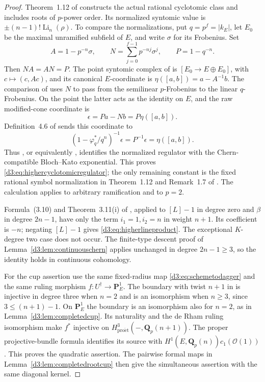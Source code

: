 \documentclass[11pt,a4paper]{amsart}
\numberwithin{equation}{section}
\theoremstyle{definition}
\theoremstyle{remark}
\newcommand{\Q}{\mathbf Q}
\newcommand{\PP}{\mathbf P}
\newcommand{\OO}{\mathcal O}
\begin{document}
\begin{proof}
Theorem~1.12 of \cite{BesserDeJeu} constructs the actual rational
cyclotomic class and includes roots of $p$-power order.
Its normalized syntomic value is
$\pm(n-1)!\operatorname{Li}_n(\rho)$.
To compare the normalizations, put $q=p^f=|k_E|$, let $E_0$ be the
maximal unramified subfield of $E$, and write $\sigma$ for its Frobenius.
Set
\[
 A=1-p^{-n}\sigma,\qquad
 N=\sum_{j=0}^{f-1}p^{-nj}\sigma^j,\qquad P=1-q^{-n}.
\]
Then $NA=AN=P$.  The point syntomic complex of
\cite[Example~2.2.4]{HuberKings} is
$[E_0\longrightarrow E\oplus E_0]$, with
$c\mapsto(c,Ac)$, and its canonical $E$-coordinate is
$\eta([a,b])=a-A^{-1}b$.
The comparison of \cite[Proposition~8.6(2)--(3), its proof and equation~(8.1)]{BesserRegulators}
uses $N$ to pass from the semilinear $p$-Frobenius to the linear
$q$-Frobenius.  On the point the latter acts as the identity on $E$,
and the raw modified-cone coordinate is
\[
 \epsilon=Pa-Nb=P\eta([a,b]).
\]
Definition~4.6 of \cite{BesserDeJeu} sends this coordinate to
\begin{equation}\label{d3:eq:pointnormalization}
 (1-\varphi_q^*/q^n)^{-1}\epsilon
   =P^{-1}\epsilon=\eta([a,b]).
\end{equation}
Thus \cite[Corollary~9.10 and Proposition~9.11]{BesserRegulators},
or equivalently \cite[Proposition~2.3.4]{HuberKings}, identifies the
normalized regulator with the Chern-compatible Bloch--Kato
exponential.  This proves \eqref{d3:eq:highercyclotomicregulator};
the only remaining constant is the fixed rational symbol normalization
in Theorem~1.12 and Remark~1.7 of \cite{BesserDeJeu}.
The calculation applies to arbitrary ramification and to $p=2$.

Formula~(3.10) and Theorem~3.11(i) of \cite{WeibelChern}, applied
to $[L]-1$ in degree zero and $\beta$ in degree $2n-1$, have only
the term $i_1=1,i_2=n$ in weight $n+1$.
Its coefficient is $-n$; negating $[L]-1$ gives
\eqref{d3:eq:higherlineproduct}. The exceptional $K$-degree two
case does not occur. The finite-type descent proof of
Lemma~\ref{d3:lem:continuouschern} applies unchanged in degree
$2n-1\geq3$, so the identity holds in continuous cohomology.

For the cup assertion use the same fixed-radius map
\eqref{d3:eq:schemetodagger} and the same ruling morphism
$f:U^\dagger\to\PP^1_E$. The boundary with twist $n+1$ in
\cite[Theorem~1.3]{ColmezNiziol} is injective in degree three
when $n=2$ and is an isomorphism when $n\geq3$, since
$3\leq(n+1)-1$. On $\PP^1_E$ the boundary is an isomorphism
also for $n=2$, as in Lemma~\ref{d3:lem:completedcup}.
Its naturality and the de Rham ruling isomorphism make
$f^*$ injective on $H^3_{\mathrm{pro\acute et}}(-,\Q_p(n+1))$.
The proper projective-bundle formula identifies its source with
$H^1(E,\Q_p(n))c_1(\OO(1))$. This proves the quadratic assertion.
The pairwise formal maps in Lemma~\ref{d3:lem:completedrootcup}
then give the simultaneous assertion with the same diagonal kernel.
\end{proof}
\end{document}
